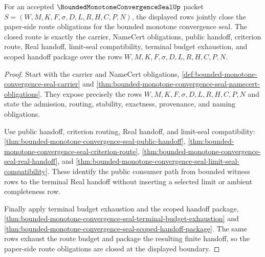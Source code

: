 \begin{theorem}
\label{thm:bounded-monotone-convergence-seal-route-obligation-closure}
For an accepted $\BoundedMonotoneConvergenceSealUp$ packet $S=(W,M,K,F,\sigma,D,L,R,H,C,P,N)$, the displayed rows jointly close the paper-side route obligations for the bounded monotone convergence seal. The closed route is exactly the carrier, NameCert obligations, public handoff, criterion route, Real handoff, limit-seal compatibility, terminal budget exhaustion, and scoped handoff package over the rows $W,M,K,F,\sigma,D,L,R,H,C,P,N$.
\end{theorem}
\begin{proof}
Start with the carrier and NameCert obligations, \autoref{def:bounded-monotone-convergence-seal-carrier} and \autoref{thm:bounded-monotone-convergence-seal-namecert-obligations}. They expose precisely the rows $W,M,K,F,\sigma,D,L,R,H,C,P,N$ and state the admission, routing, stability, exactness, provenance, and naming obligations.

Use public handoff, criterion routing, Real handoff, and limit-seal compatibility: \autoref{thm:bounded-monotone-convergence-seal-public-handoff}, \autoref{thm:bounded-monotone-convergence-seal-criterion-route}, \autoref{thm:bounded-monotone-convergence-seal-real-handoff}, and \autoref{thm:bounded-monotone-convergence-seal-limit-seal-compatibility}. These identify the public consumer path from bounded witness rows to the terminal Real handoff without inserting a selected limit or ambient completeness row.

Finally apply terminal budget exhaustion and the scoped handoff package, \autoref{thm:bounded-monotone-convergence-seal-terminal-budget-exhaustion} and \autoref{thm:bounded-monotone-convergence-seal-scoped-handoff-package}. The same rows exhaust the route budget and package the resulting finite handoff, so the paper-side route obligations are closed at the displayed boundary.
\end{proof}


